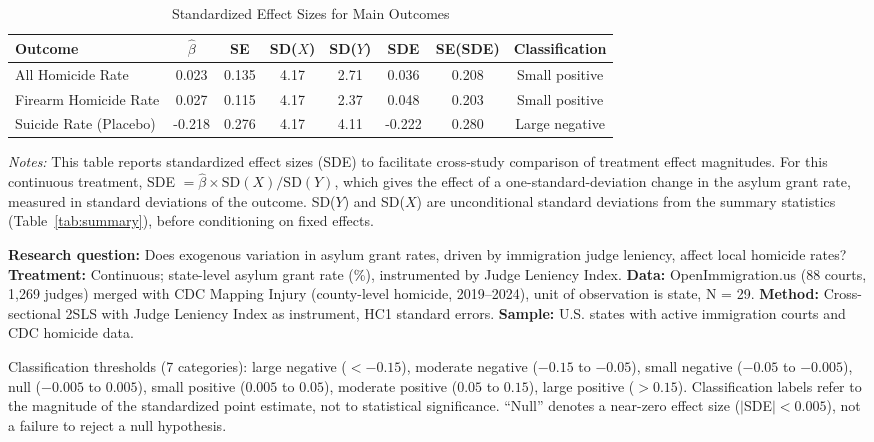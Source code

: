 \begin{table}[H]
\centering
\caption{Standardized Effect Sizes for Main Outcomes}
\label{tab:sde}
\begin{adjustbox}{max width=\textwidth}
\begin{tabular}{lccccccc}
\toprule
Outcome & $\hat{\beta}$ & SE & SD($X$) & SD($Y$) & SDE & SE(SDE) & Classification \\
\midrule
All Homicide Rate & 0.023 & 0.135 & 4.17 & 2.71 & 0.036 & 0.208 & Small positive \\
Firearm Homicide Rate & 0.027 & 0.115 & 4.17 & 2.37 & 0.048 & 0.203 & Small positive \\
Suicide Rate (Placebo) & -0.218 & 0.276 & 4.17 & 4.11 & -0.222 & 0.280 & Large negative \\
\bottomrule
\end{tabular}
\end{adjustbox}
\par\vspace{0.3em}
{\footnotesize \emph{Notes:} This table reports standardized effect sizes (SDE)
to facilitate cross-study comparison of treatment effect magnitudes.
For this continuous treatment, SDE $= \hat{\beta} \times \text{SD}(X) / \text{SD}(Y)$,
which gives the effect of a one-standard-deviation change in the asylum grant rate,
measured in standard deviations of the outcome.
SD($Y$) and SD($X$) are unconditional standard deviations from the summary
statistics (Table~\ref{tab:summary}), before conditioning on fixed effects.

\textbf{Research question:} Does exogenous variation in asylum grant rates, driven by
immigration judge leniency, affect local homicide rates?
\textbf{Treatment:} Continuous; state-level asylum grant rate (\%), instrumented by
Judge Leniency Index.
\textbf{Data:} OpenImmigration.us (88 courts, 1,269 judges) merged with CDC Mapping Injury
(county-level homicide, 2019--2024), unit of observation is state, N = 29.
\textbf{Method:} Cross-sectional 2SLS with Judge Leniency Index as instrument, HC1 standard errors.
\textbf{Sample:} U.S. states with active immigration courts and CDC homicide data.

Classification thresholds (7 categories):
large negative ($< -0.15$), moderate negative ($-0.15$ to $-0.05$),
small negative ($-0.05$ to $-0.005$), null ($-0.005$ to $0.005$),
small positive ($0.005$ to $0.05$), moderate positive ($0.05$ to $0.15$),
large positive ($> 0.15$).
Classification labels refer to the magnitude of the standardized point estimate,
not to statistical significance. ``Null'' denotes a near-zero effect size
($|$SDE$| < 0.005$), not a failure to reject a null hypothesis.}
\end{table}
